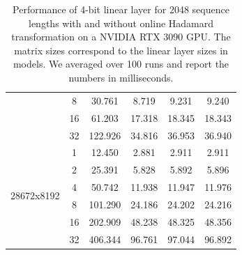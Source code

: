 \begin{table}[t]
\begin{tabular}{c|c|c|c|c|c}
 & 8 & 30.761 & 8.719 & 9.231 & 9.240\\
&  16 & 61.203 & 17.318 & 18.345 & 18.343\\
 &  32 & 122.926 & 34.816 & 36.953 & 36.940\\
 \midrule
\multirow{6}{*}{28672x8192} &1 & 12.450 & 2.881 & 2.911 & 2.911\\
& 2 & 25.391 & 5.828 & 5.892 & 5.896\\
& 4 & 50.742 & 11.938 & 11.947 & 11.976\\
& 8 & 101.290 & 24.186 & 24.202 & 24.216\\
&  16 & 202.909 & 48.238 & 48.325 & 48.356\\
& 32 & 406.344 & 96.761 & 97.044 & 96.892\\
\bottomrule
\end{tabular}
\vspace{0.5em}
    \caption{Performance of 4-bit linear layer for 2048 sequence lengths with and without online Hadamard transformation on a NVIDIA RTX 3090 GPU. The matrix sizes correspond to the linear layer sizes in \llama models. We averaged over 100 runs and report the numbers in milliseconds.
    }
    \label{tab:Qlinear_bench}
\end{table}



